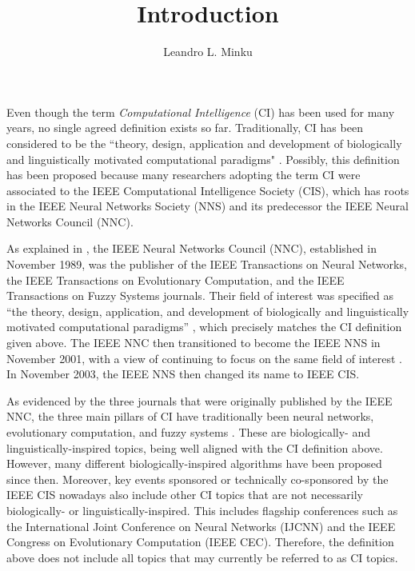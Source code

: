 \title{Introduction}
\author{Leandro L. Minku}
\maketitle
\label{chp:history}
\label{chp:definitions}


Even though the term \textit{Computational Intelligence} (CI) has been used for many years, no single agreed definition exists so far. Traditionally, CI has been considered to be the ``theory, design, application and development of biologically and linguistically motivated computational paradigms" \cite{ciswebsite}. Possibly, this definition has been proposed because many researchers adopting the term CI were associated to the IEEE Computational Intelligence Society (CIS), which has roots in the IEEE Neural Networks Society (NNS) and its predecessor the IEEE Neural Networks Council (NNC). 

As explained in \cite{cishistory}, the IEEE Neural Networks Council (NNC), established in November 1989, was the publisher of the IEEE Transactions on Neural Networks, the IEEE Transactions on Evolutionary Computation, and the IEEE Transactions on Fuzzy Systems journals. Their field of interest was specified as ``the theory, design, application, and development of biologically and linguistically motivated computational paradigms'' \cite{NNSEditorial}, which precisely matches the CI definition given above. The IEEE NNC then transitioned to become the IEEE NNS in November 2001, with a view of continuing to focus on the same field of interest \cite{NNSEditorial}. In November 2003, the IEEE NNS then changed its name to IEEE CIS. 

As evidenced by the three journals that were originally published by the IEEE NNC, the three main pillars of CI have traditionally been neural networks, evolutionary computation, and fuzzy systems \cite{ciswebsite}. These are biologically- and linguistically-inspired topics, being well aligned with the CI definition above. However, many different biologically-inspired algorithms have been proposed since then. Moreover, key events sponsored or technically co-sponsored by the IEEE CIS nowadays also include other CI topics that are not necessarily biologically- or linguistically-inspired. This includes flagship conferences such as the International Joint Conference on Neural Networks (IJCNN) and the IEEE Congress on Evolutionary Computation (IEEE CEC). Therefore, the definition above does not include all topics that may currently be referred to as CI topics.

